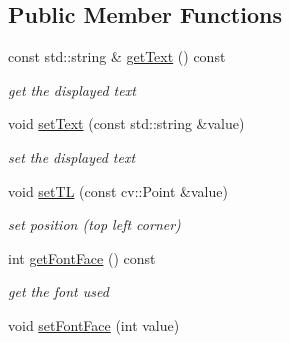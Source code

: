 \subsection*{Public Member Functions}
\begin{DoxyCompactItemize}
\item 
const std\+::string \& \hyperlink{classcanvascv_1_1TextBox_a5e746210ed7911dc7a13751b38523b2f}{get\+Text} () const \hypertarget{classcanvascv_1_1TextBox_a5e746210ed7911dc7a13751b38523b2f}{}\label{classcanvascv_1_1TextBox_a5e746210ed7911dc7a13751b38523b2f}

\begin{DoxyCompactList}\small\item\em get the displayed text \end{DoxyCompactList}\item 
void \hyperlink{classcanvascv_1_1TextBox_a1470a20a5a732ac8bbed59b0fb88aaff}{set\+Text} (const std\+::string \&value)\hypertarget{classcanvascv_1_1TextBox_a1470a20a5a732ac8bbed59b0fb88aaff}{}\label{classcanvascv_1_1TextBox_a1470a20a5a732ac8bbed59b0fb88aaff}

\begin{DoxyCompactList}\small\item\em set the displayed text \end{DoxyCompactList}\item 
void \hyperlink{classcanvascv_1_1TextBox_ac948de159dd4f71fa9dfc686404386c5}{set\+TL} (const cv\+::\+Point \&value)\hypertarget{classcanvascv_1_1TextBox_ac948de159dd4f71fa9dfc686404386c5}{}\label{classcanvascv_1_1TextBox_ac948de159dd4f71fa9dfc686404386c5}

\begin{DoxyCompactList}\small\item\em set position (top left corner) \end{DoxyCompactList}\item 
int \hyperlink{classcanvascv_1_1TextBox_aa03df359a084e01741d6e67b16d6cb72}{get\+Font\+Face} () const \hypertarget{classcanvascv_1_1TextBox_aa03df359a084e01741d6e67b16d6cb72}{}\label{classcanvascv_1_1TextBox_aa03df359a084e01741d6e67b16d6cb72}

\begin{DoxyCompactList}\small\item\em get the font used \end{DoxyCompactList}\item 
void \hyperlink{classcanvascv_1_1TextBox_a12f81ba55169d9b611aed33e7a9d4267}{set\+Font\+Face} (int value)\hypertarget{classcanvascv_1_1TextBox_a12f81ba55169d9b611aed33e7a9d4267}{}\label{classcanvascv_1_1TextBox_a12f81ba55169d9b611aed33e7a9d4267}


\end{DoxyCompactItemize}
